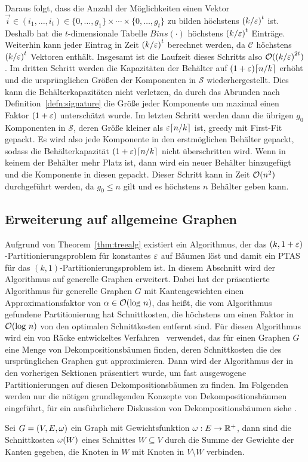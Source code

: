 Daraus folgt, dass die Anzahl der Möglichkeiten einen Vektor $\vec{i} \in (i_1, \ldots, i_t) \in \{0, \ldots, g_1\} \times \cdots \times \{0, \ldots, g_t\}$ zu bilden höchstens ${(k/\varepsilon)}^t$ ist.
Deshalb hat die $t$-dimensionale Tabelle $Bins(\cdot)$ höchstens ${(k/\varepsilon)}^t$ Einträge. 
Weiterhin kann jeder Eintrag in Zeit ${(k/\varepsilon)}^t$ berechnet werden, da $\mathcal{C}$ höchstens ${(k/\varepsilon)}^t$ Vektoren enthält.
Insgesamt ist die Laufzeit dieses Schritts also $\mathcal{O}({(k/\varepsilon)}^{2t})$.
Im dritten Schritt werden die Kapazitäten der Behälter auf $(1 + \eps) \ceil*{n/k}$ erhöht und die ursprünglichen Größen der Komponenten in $\mathcal{S}$ wiederhergestellt.
Dies kann die Behälterkapazitäten nicht verletzen, da durch das Abrunden nach Definition~\ref{defn:signature} die Größe jeder Komponente um maximal  einen Faktor $(1 + \varepsilon)$ unterschätzt wurde.
Im letzten Schritt werden dann die übrigen $g_0$ Komponenten in $\mathcal{S}$, deren Größe kleiner als $\eps \ceil*{n/k}$ ist, greedy mit First-Fit gepackt. 
Es wird also jede Komponente in den erstmöglichen Behälter gepackt, sodass die Behälterkapazität $(1 + \eps) \ceil*{n/k}$ nicht überschritten wird.
Wenn in keinem der Behälter mehr Platz ist, dann wird ein neuer Behälter hinzugefügt und die Komponente in diesen gepackt.
Dieser Schritt kann in Zeit  $\mathcal{O}(n^2)$ durchgeführt werden, da $g_0 \leq n$ gilt und es höchstens $n$ Behälter geben kann.

\subsection{Erweiterung auf allgemeine Graphen}
Aufgrund von Theorem~\ref{thm:treealg} existiert ein Algorithmus, der das $(k,1+\varepsilon)$-Partitionierungsproblem für konstantes $\varepsilon$ auf Bäumen löst und damit ein PTAS für das $(k,1)$-Partitionierungsproblem ist.
In diesem Abschnitt wird der Algorithmus auf generelle Graphen erweitert.
Dabei hat der präsentierte Algorithmus für generelle Graphen $G$ mit Kantengewichten einen Approximationsfaktor von $\alpha \in \mathcal{O}(\log \, n)$, das heißt, die vom Algorithmus gefundene Partitionierung hat Schnittkosten, die höchstens um einen Faktor in $\mathcal{O}(\log \, n)$ von den optimalen Schnittkosten entfernt sind.
Für diesen Algorithmus wird ein von Räcke entwickeltes Verfahren~\parencite{rc08} verwendet, das für einen Graphen $G$ eine Menge von Dekompositionsbäumen finden, deren Schnittkosten die des ursprünglichen Graphen gut approximieren. 
Dann wird der Algorithmus der in den vorherigen Sektionen präsentiert wurde, um fast ausgewogene Partitionierungen auf diesen Dekompositionsbäumen zu finden.
Im Folgenden werden nur die nötigen grundlegenden Konzepte von Dekompositionsbäumen eingeführt, für ein ausführlichere Diskussion von Dekompositionsbäumen siehe \parencite{rc08, ma10, ws11}.

Sei $G = (V, E, \omega)$ ein Graph mit Gewichtsfunktion $\omega : E \rightarrow \mathbb{R}^+$, dann sind die Schnittkosten $\omega(W)$ eines Schnittes $W \subseteq V$ durch die Summe der Gewichte der Kanten gegeben, die Knoten in $W$ mit Knoten in $V \setminus W$ verbinden.

